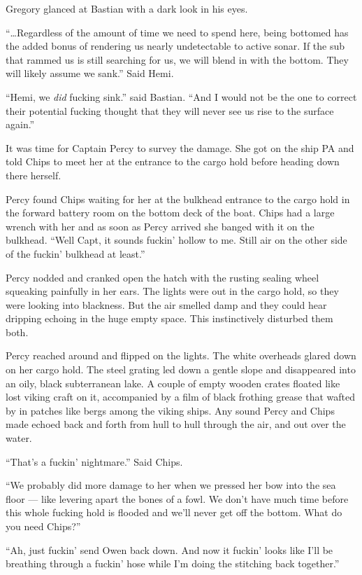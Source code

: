 \documentclass[]{article}
\begin{document}
\begin{multicols}{2}
Gregory glanced at Bastian with a dark look in his eyes.

``\ldots{}Regardless of the amount of time we need to spend here, being
bottomed has the added bonus of rendering us nearly undetectable to
active sonar. If the sub that rammed us is still searching for us, we
will blend in with the bottom. They will likely assume we sank.'' Said
Hemi.

``Hemi, we \emph{did} fucking sink.'' said Bastian. ``And I would not be
the one to correct their potential fucking thought that they will never
see us rise to the surface again.''

It was time for Captain Percy to survey the damage. She got on the ship
PA and told Chips to meet her at the entrance to the cargo hold before
heading down there herself.

Percy found Chips waiting for her at the bulkhead entrance to the cargo
hold in the forward battery room on the bottom deck of the boat. Chips
had a large wrench with her and as soon as Percy arrived she banged with
it on the bulkhead. ``Well Capt, it sounds fuckin' hollow to me. Still
air on the other side of the fuckin' bulkhead at least.''

Percy nodded and cranked open the hatch with the rusting sealing wheel
squeaking painfully in her ears. The lights were out in the cargo hold,
so they were looking into blackness. But the air smelled damp and they
could hear dripping echoing in the huge empty space. This instinctively
disturbed them both.

Percy reached around and flipped on the lights. The white overheads
glared down on her cargo hold. The steel grating led down a gentle slope
and disappeared into an oily, black subterranean lake. A couple of empty
wooden crates floated like lost viking craft on it, accompanied by a
film of black frothing grease that wafted by in patches like bergs among
the viking ships. Any sound Percy and Chips made echoed back and forth
from hull to hull through the air, and out over the water.

``That's a fuckin' nightmare.'' Said Chips.

``We probably did more damage to her when we pressed her bow into the
sea floor --- like levering apart the bones of a fowl. We don't have
much time before this whole fucking hold is flooded and we'll never get
off the bottom. What do you need Chips?''

``Ah, just fuckin' send Owen back down. And now it fuckin' looks like
I'll be breathing through a fuckin' hose while I'm doing the stitching
back together.''


\end{multicols}
\end{document}
